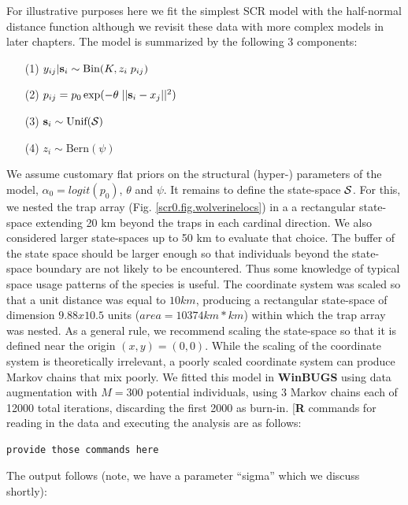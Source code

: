 For illustrative purposes here we fit the simplest SCR model with the
half-normal distance function although we revisit these data with more
complex models in later chapters. The model is summarized by the
following 3 components:
\begin{itemize}
\item[(1)] $y_{ij}|{\bf s}_{i} \sim \mbox{Bin}(K, z_{i}\; p_{ij})$
\item[(2)] $p_{ij} = p_{0} \exp(-\theta \; ||{\bf s}_{i}-x_{j}||^2)$
\item[(3)] $ {\bf s}_{i} \sim \mbox{Unif}({\cal S})$
\item[(4)] $ z_{i} \sim \mbox{Bern}(\psi)$
\end{itemize}		
We assume customary flat priors on the structural (hyper-) parameters
of the model, $\alpha_{0} = logit(p_{0})$, $\theta$ and $\psi$.  It remains to define the
state-space ${\cal S}$. For this, we nested the trap array (Fig.
\ref{scr0.fig.wolverinelocs}) in a 
a rectangular state-space extending 20 km beyond the traps in each cardinal
direction.  We also considered larger state-spaces up to 50 km to
evaluate that choice.  The buffer of the state space should be larger
enough so that individuals beyond the state-space boundary are not
likely to be encountered. Thus some knowledge of typical space usage
patterns of the species is useful.  The coordinate system was scaled
so that a unit distance was equal to $10 km$, producing a rectangular
state-space of dimension $9.88 x 10.5$ units ($area = 10374 km*km$)
within which the trap array was nested. As a general rule, we
recommend scaling the state-space so that it is defined near the
origin $(x,y)=(0,0)$. While the scaling of the coordinate system is
theoretically irrelevant, a poorly scaled coordinate system can
produce Markov chains that mix poorly.  We fitted this model in
{\bf WinBUGS} using data augmentation with $M=300$ potential individuals,
using 3 Markov chains each of 12000 total iterations, discarding the
first 2000 as burn-in.  
[{\bf R} commands for reading in the data and
executing the analysis are as follows:
\begin{verbatim}
provide those commands here
\end{verbatim}
The output
follows (note, we have a parameter ``sigma'' which we discuss
shortly):

